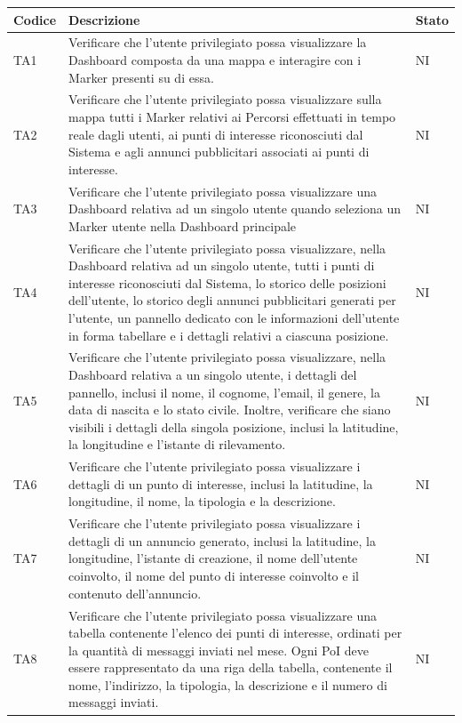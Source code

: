 \documentclass[10pt]{article}
\begin{document}
\begin{justify}
\begin{longtable}{|>{\centering\arraybackslash}m{2cm}|>{\centering\arraybackslash}m{7cm}|>{\centering\arraybackslash}m{2cm}|}
\hline
\textbf{Codice} & \textbf{Descrizione} & \textbf{Stato}\\
\endhead
\hline
TA1 & Verificare che l'utente privilegiato possa visualizzare la Dashboard composta da una mappa e interagire con i Marker presenti su di essa. & NI \\
\hline
TA2 & Verificare che l'utente privilegiato possa visualizzare sulla mappa tutti i Marker relativi ai Percorsi effettuati in tempo reale dagli utenti, ai punti di interesse riconosciuti dal Sistema e agli annunci pubblicitari associati ai punti di interesse. & NI \\
\hline
TA3 & Verificare che l'utente privilegiato possa visualizzare una Dashboard relativa ad un singolo utente quando seleziona un Marker utente nella Dashboard principale & NI \\
\hline
TA4 & Verificare che l'utente privilegiato possa visualizzare, nella Dashboard relativa ad un singolo utente, tutti i punti di interesse riconosciuti dal Sistema, lo storico delle posizioni dell'utente, lo storico degli annunci pubblicitari generati per l'utente, un pannello dedicato con le informazioni dell'utente in forma tabellare e i dettagli relativi a ciascuna posizione. & NI \\
\hline
TA5 & Verificare che l'utente privilegiato possa visualizzare, nella Dashboard relativa a un singolo utente, i dettagli del pannello, inclusi il nome, il cognome, l'email, il genere, la data di nascita e lo stato civile. Inoltre, verificare che siano visibili i dettagli della singola posizione, inclusi la latitudine, la longitudine e l'istante di rilevamento. & NI \\
\hline
TA6 & Verificare che l'utente privilegiato possa visualizzare i dettagli di un punto di interesse, inclusi la latitudine, la longitudine, il nome, la tipologia e la descrizione. & NI \\
\hline
TA7 & Verificare che l'utente privilegiato possa visualizzare i dettagli di un annuncio generato, inclusi la latitudine, la longitudine, l'istante di creazione, il nome dell'utente coinvolto, il nome del punto di interesse coinvolto e il contenuto dell'annuncio. & NI \\
\hline
TA8 & Verificare che l'utente privilegiato possa visualizzare una tabella contenente l'elenco dei punti di interesse, ordinati per la quantità di messaggi inviati nel mese. Ogni PoI deve essere rappresentato da una riga della tabella, contenente il nome, l'indirizzo, la tipologia, la descrizione e il numero di messaggi inviati. & NI \\

\end{longtable}
\end{justify}
\end{document}
